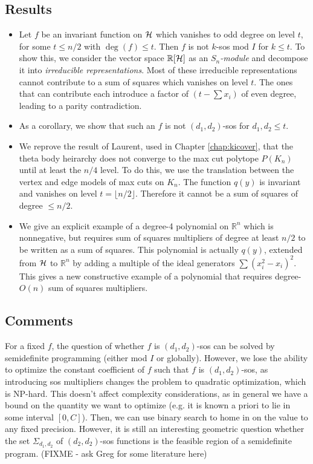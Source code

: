 \subsection{Results}
\begin{itemize}
\item Let $f$ be an invariant function on $\mathcal{H}$ which vanishes to odd degree on level $t$, for some $t \le n/2$ with $\deg (f) \le t$. 
Then $f$ is not $k$-sos mod $I$ for $k \le t$.
To show this, we consider the vector space $\mathbb{R}[\mathcal{H}]$ as an {\em $S_n$-module} and decompose it into {\em irreducible representations}.
Most of these irreducible representations cannot contribute to a sum of squares which vanishes on level $t$.
The ones that can contribute each introduce a factor of $(t - \sum x_i)$ of even degree, leading to a parity contradiction.
\item As a corollary, we show that such an $f$ is not $(d_1,d_2)$-sos for $d_1,d_2 \le t$.
\item We reprove the result of Laurent, used in Chapter \ref{chap:kicover}, that the theta body heirarchy does not converge to the max cut polytope $P(K_n)$ until at least the $n/4$ level.
To do this, we use the translation between the vertex and edge models of max cuts on $K_n$.
The function $q(y)$ is invariant and vanishes on level $t = \lfloor n/2 \rfloor$.
Therefore it cannot be a sum of squares of degree $\le n/2$.
\item We give an explicit example of a degree-4 polynomial on $\mathbb{R}^n$ which is nonnegative, but requires sum of squares multipliers of degree at least $n/2$ to be written as a sum of squares.
This polynomial is actually $q(y)$, extended from $\mathcal{H}$ to $\mathbb{R}^n$ by adding a multiple of the ideal generators $\sum (x_i^2 - x_i)^2$.
This gives a new constructive example of a polynomial that requires degree-$O(n)$ sum of squares multipliers.
\end{itemize}

\subsection{Comments}
For a fixed $f$, the question of whether $f$ is $(d_1,d_2)$-sos can be solved by semidefinite programming (either mod $I$ or globally).
However, we lose the ability to optimize the constant coefficient of $f$ such that $f$ is $(d_1,d_2)$-sos, as introducing sos multipliers changes the problem to quadratic optimization, which is NP-hard.
This doesn't affect complexity considerations, as in general we have a bound on the quantity we want to optimize (e.g. it is known a priori to lie in some interval $[0,C]$).
Then, we can use binary search to home in on the value to any fixed precision.
However, it is still an interesting geometric question whether the set $\Sigma_{d_1,d_2}$ of $(d_2,d_2)$-sos functions is the feasible region of a semidefinite program.
(FIXME - ask Greg for some literature here)


